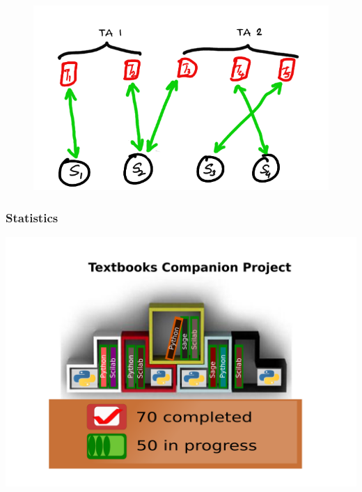 \documentclass[compress,red]{beamer} %
\begin{document}
\begin{frame}
\begin{figure}[ht]
\begin{minipage}[b]{0.5\linewidth}
\end{minipage}
\hspace{0.5cm}
\begin{minipage}[b]{0.5\linewidth}
\centering
\includegraphics[scale=0.15]{3.png}
\end{minipage}
\end{figure}
\end{frame}

\begin{frame}
\frametitle{Statistics}
\begin{center}
\includegraphics[scale=.15]{textbook.png}
\end{center}
\end{frame}
\end{document}
